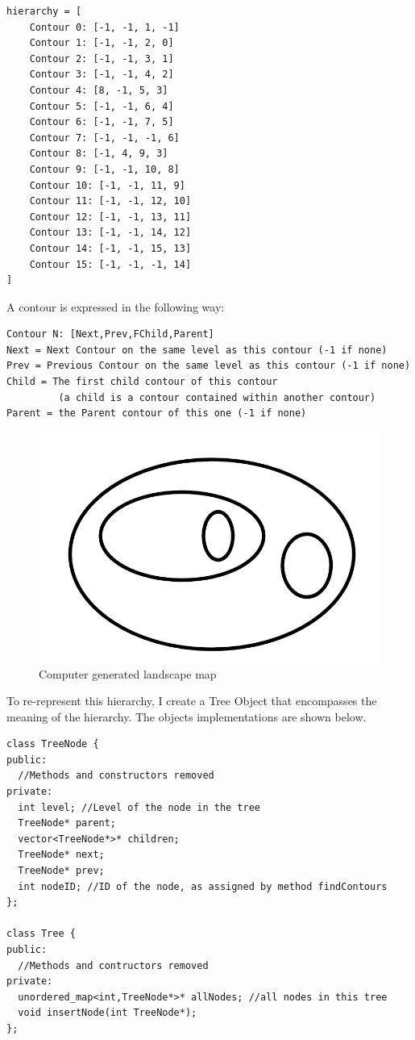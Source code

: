 \documentclass[11pt]{article}
\begin{document}
\begin{lstlisting}
hierarchy = [
	Contour 0: [-1, -1, 1, -1]
	Contour 1: [-1, -1, 2, 0]
	Contour 2: [-1, -1, 3, 1]
	Contour 3: [-1, -1, 4, 2]
	Contour 4: [8, -1, 5, 3]
	Contour 5: [-1, -1, 6, 4]
	Contour 6: [-1, -1, 7, 5]
	Contour 7: [-1, -1, -1, 6]
	Contour 8: [-1, 4, 9, 3]
	Contour 9: [-1, -1, 10, 8]
	Contour 10: [-1, -1, 11, 9]
	Contour 11: [-1, -1, 12, 10]
	Contour 12: [-1, -1, 13, 11]
	Contour 13: [-1, -1, 14, 12]
	Contour 14: [-1, -1, 15, 13]
	Contour 15: [-1, -1, -1, 14]
]
\end{lstlisting}

A contour is expressed in the following way:
\begin{verbatim}
Contour N: [Next,Prev,FChild,Parent]
Next = Next Contour on the same level as this contour (-1 if none)
Prev = Previous Contour on the same level as this contour (-1 if none)
Child = The first child contour of this contour  
         (a child is a contour contained within another contour)
Parent = the Parent contour of this one (-1 if none)
\end{verbatim}

\begin{figure}[H]
	\includegraphics[scale=0.4]{pics/perfectsimple.png}
	\caption{Computer generated landscape map}
	\label{perfectsimple}
\end{figure}

To re-represent this hierarchy, I create a Tree Object that
encompasses the meaning of the hierarchy. The objects implementations
are shown below.

\begin{lstlisting}
class TreeNode {
public:
  //Methods and constructors removed
private:
  int level; //Level of the node in the tree
  TreeNode* parent;
  vector<TreeNode*>* children;
  TreeNode* next;
  TreeNode* prev;
  int nodeID; //ID of the node, as assigned by method findContours
};

class Tree {
public:
  //Methods and contructors removed
private:
  unordered_map<int,TreeNode*>* allNodes; //all nodes in this tree
  void insertNode(int TreeNode*);
};
\end{lstlisting}
\end{document}
